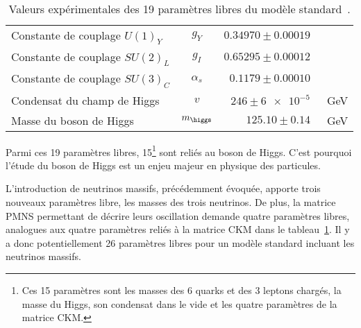 \begin{table}[h]
\begin{tabular}{lcrl}
Constante de couplage $U(1)_Y$ & $g_Y$ & $\num{0.34970}\pm\num{0.00019}$ & \\
Constante de couplage $SU(2)_L$ & $g_I$ & $\num{0.65295}\pm\num{0.00012}$ & \\
Constante de couplage $SU(3)_C$ & $\alpha_s$ & $\num{0.1179}\pm\num{0.00010}$ & \\
Condensat du champ de Higgs & $v$ & $\num{246}\pm\num{6e-5}$ & \SI{}{\GeV} \\
Masse du boson de Higgs & $m_{\higgs}$ & $\num{125.10}\pm\num{0.14}$ & \SI{}{\GeV} \\
\bottomrule
\end{tabular}
\caption[Valeurs expérimentales des 19 paramètres libres du modèle standard.]{Valeurs expérimentales des 19 paramètres libres du modèle standard~\cite{PDG_booklet_2020}.}
\label{tab-19_free_SM_parameters}
\end{table}
Parmi ces 19 paramètres libres, 15\footnote{Ces 15 paramètres sont les masses des 6 quarks et des 3 leptons chargés, la masse du Higgs, son condensat dans le vide et les quatre paramètres de la matrice CKM.} sont reliés au boson de Higgs. C'est pourquoi l'étude du boson de Higgs est un enjeu majeur en physique des particules.
\par L'introduction de neutrinos massifs, précédemment évoquée, apporte trois nouveaux paramètres libre, les masses des trois neutrinos. De plus, la matrice PMNS permettant de décrire leurs oscillation demande quatre paramètres libres, analogues aux quatre paramètres reliés à la matrice CKM dans le tableau~\ref{tab-19_free_SM_parameters}. Il y a donc potentiellement 26 paramètres libres pour un modèle standard incluant les neutrinos massifs.
